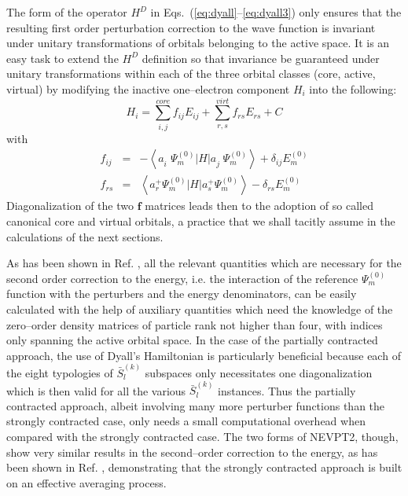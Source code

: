 \documentclass[global,referee]{svjour}
\newcommand{\bracket}[3]{\left<#1\left|#2\right|#3\right>}
\newcommand{\psimz}{\Psi_m^{(0)}}
\newcommand{\pertusb}{\bar{S}_l^{(k)}}
\newcommand{\E}[1]{E_{#1}}
\newcommand{\crea}[1]{a_{#1}^{+}}
\newcommand{\dist}[1]{a_{#1}^{\phantom{+}}}
\newcommand{\emp}[1]{E_m^{(#1)}}
\begin{document}
The form of the operator $H^D$ in Eqs.~(\ref{eq:dyall}--\ref{eq:dyall3}) only ensures
that the resulting first order perturbation correction to the
wave function is invariant under unitary transformations of orbitals
belonging to the active space. It is an easy task to extend the $H^D$
definition so that invariance be guaranteed under unitary
transformations within each of the three orbital classes (core,
active, virtual) by modifying the inactive one--electron component
$H_i$ into the following:
\begin{equation}
  \label{eq:dyall4}
H_i = \sum_{i,j}^{core}f_{ij}\E{ij} +
\sum_{r,s}^{virt}f_{rs}\E{rs} +C
\end{equation}
with 
\begin{eqnarray}
  \label{eq:dyall5}
  f_{ij} &=& - \bracket{\dist{i}\psimz}{H}{\dist{j}\psimz}
  +\delta_{ij}\emp{0}\\
  \label{eq:dyall6}
  f_{rs} &=& \bracket{\crea{r}\psimz}{H}{\crea{s}\psimz} -\delta_{rs}\emp{0}
\end{eqnarray}
Diagonalization of the two $\mathbf{f}$ matrices leads then to the
adoption of so called canonical core and virtual orbitals, a practice that we
shall tacitly assume in the calculations of the next sections.

As has been shown in Ref. \cite{nev3}, all the relevant quantities
which are necessary for the second order correction to the energy,
i.e. the interaction of the reference $\psimz$ function with the
perturbers and the energy denominators, can be easily calculated with
the help of auxiliary quantities which need the knowledge of the
zero--order density matrices of particle rank not higher than four,
with indices only spanning the active orbital space. In the case of
the partially contracted approach, the use of Dyall's Hamiltonian is
particularly beneficial because each of the eight typologies of
$\pertusb$ subspaces only necessitates one diagonalization which is
then valid for all the various $\pertusb$ instances. Thus the
partially contracted approach, albeit involving many more perturber functions
than the strongly contracted case, only needs a small computational
overhead when compared with the strongly contracted case. The two
forms of NEVPT2, though, show very similar results in the
second--order correction to the energy, as has been shown in
Ref. \cite{nev3}, demonstrating that the strongly contracted approach
is built on an effective averaging process.
\end{document}
